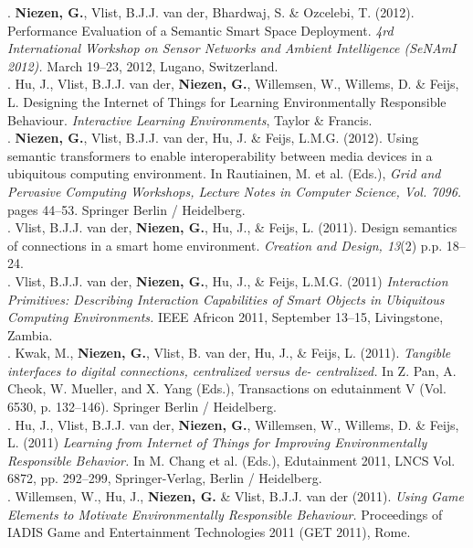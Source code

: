 . \textbf{Niezen, G.}, Vlist, B.J.J. van der, Bhardwaj, S. \& Ozcelebi, T. (2012). Performance Evaluation of a Semantic Smart Space Deployment. \emph{4rd International Workshop on Sensor Networks and Ambient Intelligence (SeNAmI 2012).} March 19--23, 2012, Lugano, Switzerland.\\

. Hu, J., Vlist, B.J.J. van der, \textbf{Niezen, G.}, Willemsen, W., Willems, D. \& Feijs, L. Designing the Internet of Things for Learning Environmentally Responsible Behaviour. \emph{Interactive Learning Environments}, Taylor \& Francis.\\

. \textbf{Niezen, G.}, Vlist, B.J.J. van der, Hu, J. \& Feijs, L.M.G. (2012). Using semantic transformers to enable interoperability between media devices in a ubiquitous computing environment. In Rautiainen, M. et al. (Eds.), \emph{Grid and Pervasive Computing Workshops, Lecture Notes in Computer Science, Vol. 7096.} pages 44--53. Springer Berlin / Heidelberg.\\

. Vlist, B.J.J. van der, \textbf{Niezen, G.}, Hu, J., \& Feijs, L. (2011). Design semantics of connections in a smart home environment. \emph{Creation and Design, 13}(2) p.p. 18--24.\\

. Vlist, B.J.J. van der, \textbf{Niezen, G.}, Hu, J., \& Feijs, L.M.G. (2011) \emph{Interaction Primitives: Describing Interaction Capabilities of Smart Objects in Ubiquitous Computing Environments.} IEEE Africon 2011, September 13--15, Livingstone, Zambia.\\

. Kwak, M., \textbf{Niezen, G.}, Vlist, B. van der, Hu, J., \& Feijs, L. (2011). \emph{Tangible interfaces to digital connections, centralized versus de- centralized.} In Z. Pan, A. Cheok, W. Mueller, and X. Yang (Eds.), Transactions on edutainment V (Vol. 6530, p. 132--146). Springer Berlin / Heidelberg.\\

. Hu, J., Vlist, B.J.J. van der, \textbf{Niezen, G.}, Willemsen, W., Willems, D. \& Feijs, L. (2011) \emph{ Learning from Internet of Things for Improving Environmentally Responsible Behavior.} In M. Chang et al. (Eds.), Edutainment 2011, LNCS Vol. 6872, pp. 292--299, Springer-Verlag, Berlin / Heidelberg.\\

. Willemsen, W., Hu, J., \textbf{Niezen, G.} \& Vlist, B.J.J. van der (2011). \emph{Using Game Elements to Motivate Environmentally Responsible Behaviour.} Proceedings of IADIS Game and Entertainment Technologies 2011 (GET 2011), Rome.\\

